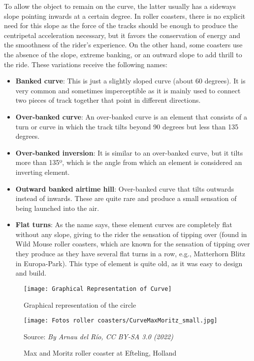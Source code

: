\documentclass[12pt,twoside,a4paper]{article}
\newcommand{\source}[1]{\caption*{Source: \textit{#1}} }
\begin{document}
	To allow the object to remain on the curve, the latter usually has a sideways slope pointing inwards at a certain degree. In roller coasters, there is no explicit need for this slope as the force of the tracks should be enough to produce the centripetal acceleration necessary, but it favors the conservation of energy and the smoothness of the rider's experience. On the other hand, some coasters use the absence of the slope, extreme banking, or an outward slope to add thrill to the ride. These variations receive the following names:
	\begin{itemize}
		\item \textbf{Banked curve}: This is just a slightly sloped curve (about 60 degrees). It is very common and sometimes imperceptible as it is mainly used to connect two pieces of track together that point in different directions.
		
		\item \textbf{Over-banked curve}: An over-banked curve is an element that consists of a turn or curve in which the track tilts beyond 90 degrees but less than 135 degrees.
		
		\item \textbf{Over-banked inversion}: It is similar to an over-banked curve, but it tilts more than 135º, which is the angle from which an element is considered an inverting element.
		
		\item \textbf{Outward banked airtime hill}: Over-banked curve that tilts outwards instead of inwards. These are quite rare and produce a small sensation of being launched into the air.
		
		\item \textbf{Flat turns}: As the name says, these element curves are completely flat without any slope, giving to the rider the sensation of tipping over (found in Wild Mouse roller coasters, which are known for the sensation of tipping over they produce as they have several flat turns in a row, e.g., Matterhorn Blitz in Europa-Park). This type of element is quite old, as it was easy to design and build.
	\end{itemize}
	
	\begin{figure}[H]
		\centering
		\texttt{[image: Graphical Representation of Curve]}
		\caption{Graphical representation of the circle}
		\label{graph:Curve}
	\end{figure}

	\begin{figure}[H]
		\centering
		\texttt{[image: Fotos roller coasters/CurveMaxMoritz\_small.jpg]}
		\caption{Max and Moritz roller coaster at Efteling, Holland}
		\label{fig:MaxMoritz}
		\source{By Arnau del Río, CC BY-SA 3.0 (2022)}
	\end{figure}
	
\end{document}
